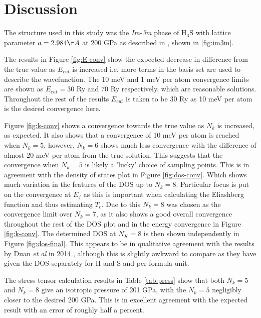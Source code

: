 \documentclass[a4paper,12pt]{article}
\begin{document}
\section{Discussion}
The structure used in this study was the \textit{Im-3m} phase of H$_3$S with lattice parameter $a=2.984 \AA$ at 200 GPa as described in \cite{duan}, shown in \ref{fig:im3m}.

\bigskip

\noindent The results in Figure \ref{fig:E-conv} show the expected decrease in difference from the true value as $E_{cut}$ is increased i.e. more terms in the basis set are used to describe the wavefunction. The 10 meV and 1 meV per atom convergence limits are shown as $E_{cut}= 30$ Ry and 70 Ry respectively, which are reasonable solutions. Throughout the rest of the results $E_{cut}$ is taken to be 30 Ry as 10 meV per atom is the desired convergence here.

\bigskip
\noindent Figure \ref{fig:k-conv} shows a convergence towards the true value as $N_k$ is increased, as expected. It also shows that a convergence of 10 meV per atom is reached when $N_k = 5$, however, $N_k=6$ shows much less convergence with the difference of almost 20 meV per atom from the true solution. This suggests that the convergence when $N_k=5$ is likely a 'lucky' choice of sampling points. This is in agreement with the density of states plot in Figure \ref{fig:dos-conv}. Which shows much variation in the features of the DOS up to $N_k=8$. Particular focus is put on the convergence at $E_f$ as this is important when calculating the Eliashberg function and thus estimating $T_c$. Due to this $N_k=8$ was chosen as the convergence limit over $N_k=7$, as it also shows a good overall convergence throughout the rest of the DOS plot and in the energy convergence in Figure \ref{fig:k-conv}. The determined DOS at $N_K=8$ is then shown independently in Figure \ref{fig:dos-final}. This appears to be in qualitative agreement with the results by Duan \textit{et al} in 2014 \cite{duan}, although this is slightly awkward to compare as they have given the DOS separately for H and S and per formula unit. 

\bigskip
\noindent The stress tensor calculation results in Table \ref{tab:press} show that both $N_k=5$ and $N_k=8$ give an isotropic pressure of 201 GPa, with the $N_k=5$ negligibly closer to the desired 200 GPa. This is in excellent agreement with the expected result with an error of roughly half a percent.
\end{document}
